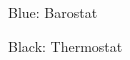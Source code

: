 \documentclass[landscape,twocolumn]{article}
\begin{document}
{\color{blue} Blue: Barostat}

{\color{black} Black: Thermostat}

\vspace{\baselineskip}


\end{document}
